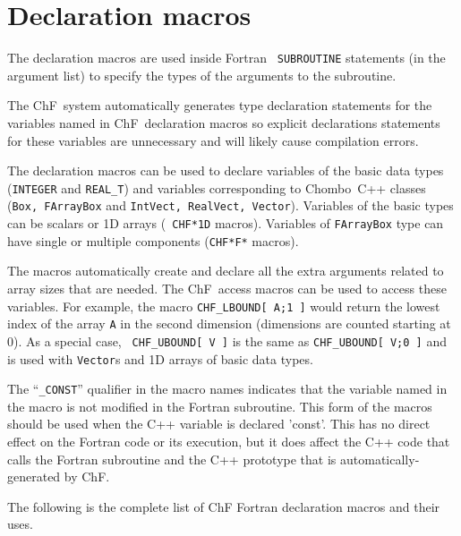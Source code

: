 \section{Declaration macros}

The declaration macros are used inside Fortran {\tt
SUBROUTINE} statements (in the argument list) to specify
the types of the arguments to the subroutine. 

The ChF\ system automatically generates type declaration statements for the
variables named in ChF\ declaration macros so explicit declarations
statements for these variables are unnecessary and will likely cause
compilation errors.

The declaration macros can be used to declare variables of the basic data
types ({\tt INTEGER} and {\tt REAL\_T}) and variables corresponding to
Chombo\ C++ classes ({\tt Box, FArrayBox} and {\tt IntVect, RealVect,
Vector}).  Variables of the basic types can be scalars or 1D arrays ({\tt
CHF*1D} macros).  Variables of {\tt FArrayBox} type can have single or
multiple components ({\tt CHF*F*} macros).

The macros automatically create and declare all the extra arguments related
to array sizes that are needed.  The ChF\ access macros can be used to
access these variables.  For example, the macro {\tt CHF\_LBOUND[ A;1 ]}
would return the lowest index of the array {\tt A} in the second dimension
(dimensions are counted starting at 0).  As a special case, {\tt
CHF\_UBOUND[ V ]} is the same as {\tt CHF\_UBOUND[ V;0 ]} and is used with
{\tt Vector}s and 1D arrays of basic data types.

The ``{\tt \_CONST}'' qualifier in the macro names indicates that the
variable named in the macro is not modified in the Fortran subroutine.  This
form of the macros should be used when the C++ variable is declared 'const'.
This has no direct effect on the Fortran code or its execution, but it does
affect the C++ code that calls the Fortran subroutine and the C++ prototype
that is automatically-generated by ChF.

The following is the complete list of ChF Fortran declaration macros and
their uses.

